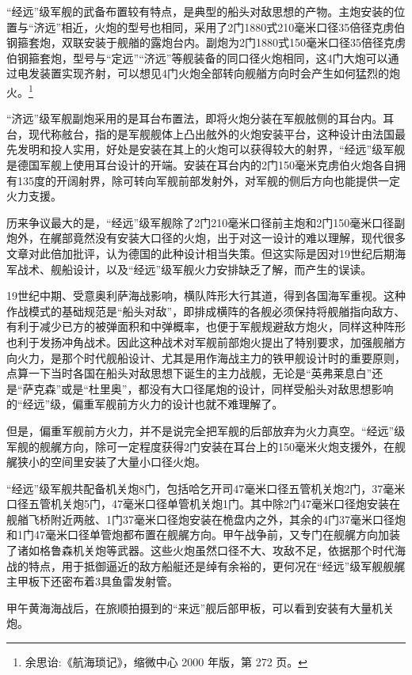 \documentclass[12pt,UTF8]{ctexbook}
\begin{document}
“经远”级军舰的武备布置较有特点，是典型的船头对敌思想的产物。主炮安装的位置与“济远”相近，火炮的型号也相同，采用了2门1880式210毫米口径35倍径克虏伯钢箍套炮，双联安装于舰艏的露炮台内。副炮为2门1880式150毫米口径35倍径克虏伯钢箍套炮，型号与“定远”“济远”等舰装备的同口径火炮相同，这4门大炮可以通过电发装置实现齐射，可以想见4门火炮全部转向舰艏方向时会产生如何猛烈的炮火。\footnote{余思诒:《航海琐记》，缩微中心 2000 年版，第 272 页。}

“济远”级军舰副炮采用的是耳台布置法，即将火炮分装在军舰舷侧的耳台内。耳台，现代称舷台，指的是军舰舰体上凸出舷外的火炮安装平台，这种设计由法国最先发明和投人实用，好处是安装在其上的火炮可以获得较大的射界，“经远”级军舰是德国军舰上使用耳台设计的开端。安装在耳台内的2门150毫米克虏伯火炮各自拥有135度的开阔射界，除可转向军舰前部发射外，对军舰的侧后方向也能提供一定火力支援。

历来争议最大的是，“经远”级军舰除了2门210毫米口径前主炮和2门150毫米口径副炮外，在艉部竟然没有安装大口径的火炮，出于对这一设计的难以理解，现代很多文章对此倍加批评，认为德国的此种设计相当失策。但这实际是因对19世纪后期海军战术、舰船设计，以及“经远”级军舰火力安排缺乏了解，而产生的误读。

19世纪中期、受意奥利萨海战影响，横队阵形大行其道，得到各国海军重视。这种作战模式的基础规范是“船头对敌”，即排成横阵的各舰必须保持将舰艏指向敌方、有利于减少已方的被弹面积和中弹概率，也便于军舰规避敌方炮火，同样这种阵形也利于发扬冲角战术。因此这种战术对军舰前部炮火提出了特别要求，加强舰艏方向火力，是那个时代舰船设计、尤其是用作海战主力的铁甲舰设计时的重要原则，点算一下当时各国在船头对敌思想下诞生的主力战舰，无论是“英弗莱息白”还是“萨克森”或是“杜里奥”，都没有大口径尾炮的设计，同样受船头对敌思想影响的“经远”级，偏重军舰前方火力的设计也就不难理解了。

但是，偏重军舰前方火力，并不是说完全把军舰的后部放弃为火力真空。“经远”级军舰的舰艉方向，除可一定程度获得2门安装在耳台上的150毫米火炮支援外，在舰艉狭小的空间里安装了大量小口径火炮。

“经远”级军舰共配备机关炮8门，包括哈乞开司47毫米口径五管机关炮2门，37毫米口径五管机关炮5门，47毫米口径单管机关炮1门。其中除2门47毫米口径炮安装在舰艏飞桥附近两舷、1门37毫米口径炮安装在桅盘内之外，其余的4门37毫米口径炮和1门47毫米口径单管炮都布置在舰艉方向。甲午战争前，又专门在舰艉方向加装了诸如格鲁森机关炮等武器。这些火炮虽然口径不大、攻敌不足，依据那个时代海战的特点，用于抵御逼近的敌方船艇还是绰有余裕的，更何况在“经远”级军舰舰艉主甲板下还密布着3具鱼雷发射管。

甲午黄海海战后，在旅顺拍摄到的“来远”舰后部甲板，可以看到安装有大量机关炮。
\end{document}
